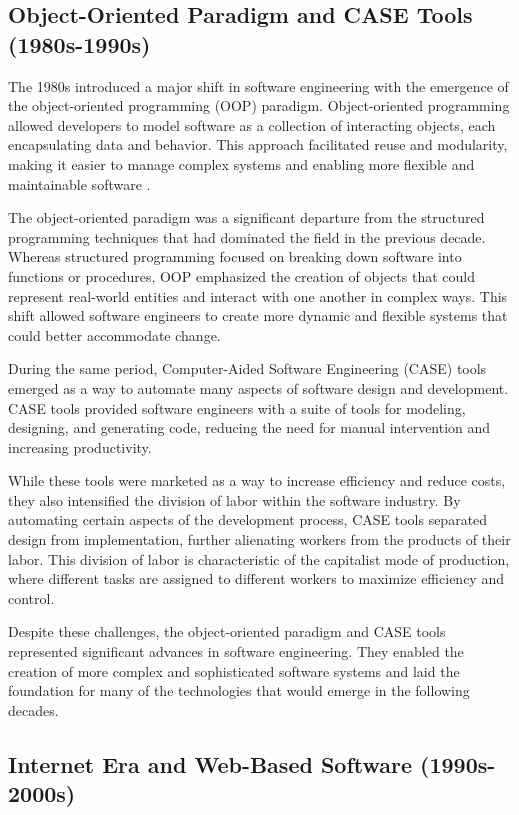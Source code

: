 \begin{refsection}
\begin{multicols}{2}
{\subsection{Object-Oriented Paradigm and CASE Tools (1980s-1990s)}

The 1980s introduced a major shift in software engineering with the emergence of the object-oriented programming (OOP) paradigm. Object-oriented programming allowed developers to model software as a collection of interacting objects, each encapsulating data and behavior. This approach facilitated reuse and modularity, making it easier to manage complex systems and enabling more flexible and maintainable software \cite[p. 121]{stroustrup1994}.

The object-oriented paradigm was a significant departure from the structured programming techniques that had dominated the field in the previous decade. Whereas structured programming focused on breaking down software into functions or procedures, OOP emphasized the creation of objects that could represent real-world entities and interact with one another in complex ways. This shift allowed software engineers to create more dynamic and flexible systems that could better accommodate change.

During the same period, Computer-Aided Software Engineering (CASE) tools emerged as a way to automate many aspects of software design and development. CASE tools provided software engineers with a suite of tools for modeling, designing, and generating code, reducing the need for manual intervention and increasing productivity.

While these tools were marketed as a way to increase efficiency and reduce costs, they also intensified the division of labor within the software industry. By automating certain aspects of the development process, CASE tools separated design from implementation, further alienating workers from the products of their labor. This division of labor is characteristic of the capitalist mode of production, where different tasks are assigned to different workers to maximize efficiency and control.

Despite these challenges, the object-oriented paradigm and CASE tools represented significant advances in software engineering. They enabled the creation of more complex and sophisticated software systems and laid the foundation for many of the technologies that would emerge in the following decades.

\subsection{Internet Era and Web-Based Software (1990s-2000s)}

}
\end{multicols}
\end{refsection}
